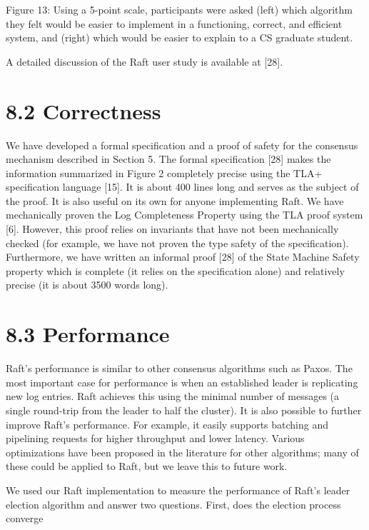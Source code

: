 \documentclass[
]{article}
\begin{document}
Figure 13: Using a 5-point scale, participants were asked (left) which
algorithm they felt would be easier to implement in a functioning,
correct, and efficient system, and (right) which would be easier to
explain to a CS graduate student.

A detailed discussion of the Raft user study is available at {[}28{]}.

\section{8.2 Correctness}\label{correctness}

We have developed a formal specification and a proof of safety for the
consensus mechanism described in Section 5. The formal specification
{[}28{]} makes the information summarized in Figure 2 completely precise
using the TLA+ specification language {[}15{]}. It is about 400 lines
long and serves as the subject of the proof. It is also useful on its
own for anyone implementing Raft. We have mechanically proven the Log
Completeness Property using the TLA proof system {[}6{]}. However, this
proof relies on invariants that have not been mechanically checked (for
example, we have not proven the type safety of the specification).
Furthermore, we have written an informal proof {[}28{]} of the State
Machine Safety property which is complete (it relies on the
specification alone) and relatively precise (it is about 3500 words
long).

\section{8.3 Performance}\label{performance}

Raft's performance is similar to other consensus algorithms such as
Paxos. The most important case for performance is when an established
leader is replicating new log entries. Raft achieves this using the
minimal number of messages (a single round-trip from the leader to half
the cluster). It is also possible to further improve Raft's performance.
For example, it easily supports batching and pipelining requests for
higher throughput and lower latency. Various optimizations have been
proposed in the literature for other algorithms; many of these could be
applied to Raft, but we leave this to future work.

We used our Raft implementation to measure the performance of Raft's
leader election algorithm and answer two questions. First, does the
election process converge
\end{document}
